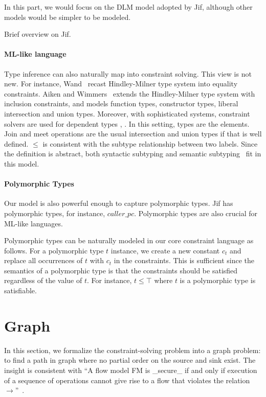 In this part, we would focus on the DLM model adopted by Jif, although
other models would be simpler to be modeled.

Brief overview on Jif.

\paragraph{ML-like language}

Type inference can also naturally map into constraint solving. This
view is not new. For instance, Wand~\cite{wand-typeinference} recast
Hindley-Milner type system into equality constraints. Aiken and
Wimmers~\cite{aiken-typeinclusion} extends the Hindley-Milner type
system with inclusion constraints, and models function types,
constructor types, liberal intersection and union types. Moreover,
with sophisticated systems, constraint solvers are used for dependent
types , . In this setting, types are the
elements. Join and meet operations are the usual intersection and
union types if that is well defined.  $\leq$ is consistent with the
subtype relationship between two labels.  Since the definition is
abstract, both syntactic subtyping  and semantic
subtyping~\cite{aiken-typeinclusion} fit in this model.

\paragraph{Polymorphic Types}

Our model is also powerful enough to capture polymorphic types.  Jif
has polymorphic types, for instance, $caller\_pc$. Polymorphic types
are also crucial for ML-like languages.

Polymorphic types can be naturally modeled in our core constraint
language as follows. For a polymorphic type $t$ instance, we create a
new constant $c_t$ and replace all occurrences of $t$ with $c_t$ in
the constraints. This is sufficient since the semantics of a
polymorphic type is that the constraints should be satisfied
regardless of the value of $t$. For instance, $t\leq \top$ where $t$
is a polymorphic type is satisfiable.

\section{Graph} 

In this section, we formalize the constraint-solving problem into a
graph problem: to find a path in graph where no partial order on the
source and sink exist. The insight is consistent with ``A flow model
FM is _secure_ if and only if execution of a sequence of operations
cannot give rise to a flow that violates the relation
$\rightarrow$''~\cite{denning-lattice}.


